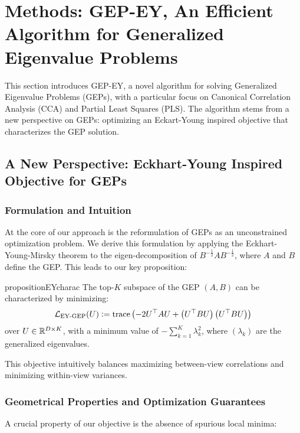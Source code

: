 \section{Methods: GEP-EY, An Efficient Algorithm for Generalized Eigenvalue Problems}\label{sec:contributions}
This section introduces GEP-EY, a novel algorithm for solving Generalized Eigenvalue Problems (GEPs), with a particular focus on Canonical Correlation Analysis (CCA) and Partial Least Squares (PLS). The algorithm stems from a new perspective on GEPs: optimizing an Eckart-Young inspired objective that characterizes the GEP solution.

\subsection{A New Perspective: Eckhart-Young Inspired Objective for GEPs}

\subsubsection{Formulation and Intuition}
At the core of our approach is the reformulation of GEPs as an unconstrained optimization problem. We derive this formulation by applying the Eckhart-Young-Mirsky theorem to the eigen-decomposition of $B^{-\frac{1}{2}} A B^{-\frac{1}{2}}$, where $A$ and $B$ define the GEP. This leads to our key proposition:

\begin{restatable}{proposition}{EYcharac}
    \label{prop:EY-charac}
    The top-$K$ subspace of the GEP $(A,B)$ can be characterized by minimizing:
    \begin{align}\label{eq:EY-charac}
    \mathcal{L}_\text{EY-GEP}(U) \vcentcolon= \operatorname{trace} \left( - 2U^\top A U + \left(U^\top B U\right) \left(U^\top B U\right) \right)
    \end{align}
    over $U \in \mathbb{R}^{D \times K}$, with a minimum value of $- \sum_{k=1}^K \lambda_k^2$, where $(\lambda_k)$ are the generalized eigenvalues.
\end{restatable}
    
This objective intuitively balances maximizing between-view correlations and minimizing within-view variances.

\subsubsection{Geometrical Properties and Optimization Guarantees}
A crucial property of our objective is the absence of spurious local minima:

